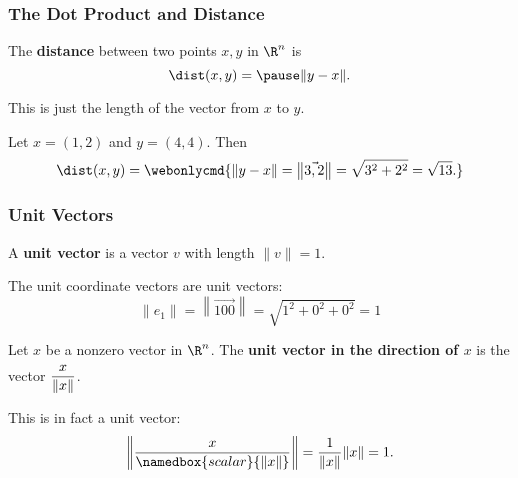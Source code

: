 \begin{frame}
\frametitle{The Dot Product and Distance}

\vskip -3mm
\begin{defn}
  The \textbf{distance} between two points $x,y$ in $\R^n$ is
  \[ \dist(x,y) = \pause \|y-x\|. \]
\end{defn}

\pause
This is just the length of the vector from $x$ to $y$.

\pause
\begin{eg}
  Let $x = (1,2)$ and $y = (4,4)$.  Then
  \[ \dist(x,y) = \webonlycmd{
    \|y-x\| = \left\|\vec{3,2}\right\| = \sqrt{3^2+2^2} = \sqrt{13}.
  } \]
  \pause
  \begin{center}
  \end{center}

\end{eg}

\end{frame}



\begin{frame}
\frametitle{Unit Vectors}

\vskip-3mm
\begin{defn}
  A \textbf{unit vector} is a vector $v$ with length $\|v\|=1$.
\end{defn}

\pause
\begin{eg}
  The unit coordinate vectors are unit vectors:
  \[
    \|e_1\| = \left\|\vec{1 0 0}\right\| = \sqrt{1^2 + 0^2 + 0^2} = 1 
  \]
\end{eg}

\pause
\begin{defn}
  Let $x$ be a nonzero vector in $\R^n$.  The
  \textbf{unit vector in the direction of $x$} is the vector
  $\displaystyle\frac{\mathstrut x}{\|x\|}$.
\end{defn}

\pause\medskip
This is in fact a unit vector:
\[ \left\|\frac{x}{\namedbox{scalar}{\|x\|}}\right\|
= \frac 1{\|x\|}\|x\| = 1. \]

\end{frame}


